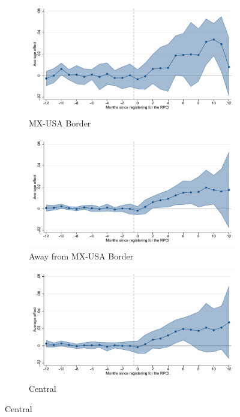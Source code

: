 \begin{figure}[H]
    \centering
    \caption{Event studies - RPCI effect on log wages}
    
    \begin{subfigure}{0.32\textwidth}
    \caption{MX-USA Border}
    \includegraphics[width=\textwidth]{04_Figures/muestra_10porciento/event_study_log_sal_cierre_frontera_dcdh_connected.pdf}
    \end{subfigure}
    \begin{subfigure}{0.32\textwidth}
    \caption{Away from MX-USA Border}
    \includegraphics[width=\textwidth]{04_Figures/muestra_10porciento/event_study_log_sal_cierre_no_frontera_dcdh_connected.pdf}
    \end{subfigure}
    \begin{subfigure}{0.32\textwidth}
    \caption{Central}
    \includegraphics[width=\textwidth]{04_Figures/muestra_10porciento/event_study_log_sal_cierre_reg_centro_dcdh_connected.pdf}
    \end{subfigure}
    

\end{figure}
